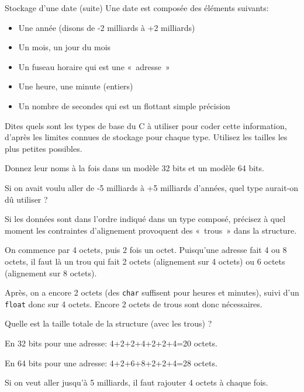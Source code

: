 \begin{exercice}
  \begin{exercicelet}{Stockage d'une date (suite)}
    Une date est composée des éléments suivants:
    \begin{itemize}
    \item Une année (disons de -2 milliards à +2 milliards)
    \item Un mois, un jour du mois
    \item Un fuseau horaire qui est une «~adresse~»
    \item Une heure, une minute (entiers)
    \item Un nombre de secondes qui est un flottant simple précision
    \end{itemize}
    \begin{questions}
    \item Dites quels sont les types de base du C à utiliser pour coder cette
      information, d'après les limites connues de stockage pour chaque
      type. Utilisez les tailles les plus petites possibles.
    \item Donnez leur noms à la fois dans un modèle 32 bits et un modèle 64
      bits.
    \item Si on avait voulu aller de -5 milliards à +5 milliards d'années,
      quel type aurait-on dû utiliser ?
    \item Si les données sont dans l'ordre indiqué dans un type composé,
      précisez à quel moment les contraintes d'alignement provoquent des
      «~trous~» dans la structure.
      \begin{xcorrection}
        On commence par 4 octets, puis 2 fois un octet. Puisqu'une adresse
        fait 4 ou 8 octets, il faut là un trou qui fait 2 octets (alignement
        sur 4 octets) ou 6 octets (alignement sur 8 octets).

        Après, on a encore 2 octets (des \texttt{char} suffisent pour heures
        et minutes), suivi d'un \texttt{float} donc sur 4 octets. Encore 2
        octets de trous sont donc nécessaires.
      \end{xcorrection}
    \item Quelle est la taille totale de la structure (avec les trous) ?
      \begin{xcorrection}
        En 32 bits pour une adresse: 4+2+2+4+2+2+4=20 octets.

        En 64 bits pour une adresse: 4+2+6+8+2+2+4=28 octets.

        Si on veut aller jusqu'à 5 milliards, il faut rajouter 4 octets à
        chaque fois.
      \end{xcorrection}
    \end{questions}
  \end{exercicelet}
\end{exercice}
